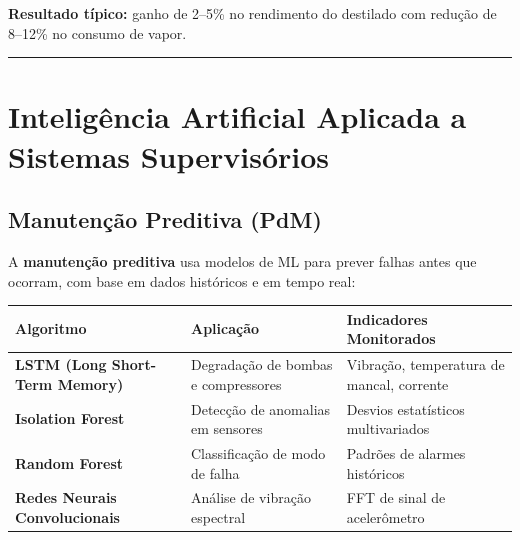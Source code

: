 \textbf{Resultado típico:} ganho de 2--5\% no rendimento do destilado com redução de 8--12\% no consumo de vapor.

\begin{center}\rule{0.5\linewidth}{0.5pt}\end{center}

\section{Inteligência Artificial Aplicada a Sistemas Supervisórios}\label{inteliguxeancia-artificial-aplicada-a-sistemas-supervisuxf3rios}

\subsection{Manutenção Preditiva (PdM)}\label{manutenuxe7uxe3o-preditiva-pdm}

A \textbf{manutenção preditiva} usa modelos de ML para prever falhas antes que ocorram, com base em dados históricos e em tempo real:

\begin{longtable}[]{@{}
  >{\raggedright\arraybackslash}p{}
  >{\raggedright\arraybackslash}p{}
  >{\raggedright\arraybackslash}p{}@{}}
\toprule\noalign{}
\begin{minipage}[b]{\linewidth}\raggedright
Algoritmo
\end{minipage} & \begin{minipage}[b]{\linewidth}\raggedright
Aplicação
\end{minipage} & \begin{minipage}[b]{\linewidth}\raggedright
Indicadores Monitorados
\end{minipage} \\
\midrule\noalign{}
\endhead
\bottomrule\noalign{}
\endlastfoot
\textbf{LSTM (Long Short-Term Memory)} & Degradação de bombas e compressores & Vibração, temperatura de mancal, corrente \\
\textbf{Isolation Forest} & Detecção de anomalias em sensores & Desvios estatísticos multivariados \\
\textbf{Random Forest} & Classificação de modo de falha & Padrões de alarmes históricos \\
\textbf{Redes Neurais Convolucionais} & Análise de vibração espectral & FFT de sinal de acelerômetro \\
\end{longtable}

